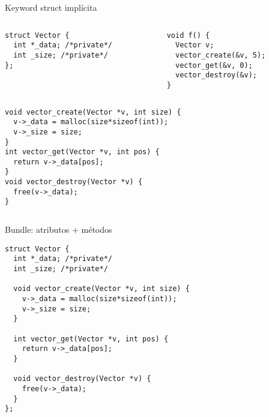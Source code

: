 \begin{frame}{Keyword struct impl\'icita}
   \begin{columns}[t]
      \begin{column}{.4\linewidth}
         \begin{lstlisting}[style=normal,firstnumber=1]
struct Vector {
  int *_data; /*private*/
  int _size; /*private*/
};


         \end{lstlisting}
      \end{column}
      \begin{column}{.4\linewidth}
         \begin{lstlisting}[style=normal,firstnumber=15,linebackgroundcolor={%
                 \btLstHLB<1>{16}%
         }]
void f() {
  Vector v;
  vector_create(&v, 5);
  vector_get(&v, 0);
  vector_destroy(&v);
}
         \end{lstlisting}
      \end{column}
   \end{columns}

   \begin{columns}[t]
      \begin{column}{.4\linewidth}
        \begin{lstlisting}[style=normal,firstnumber=5]
void vector_create(Vector *v, int size) {
  v->_data = malloc(size*sizeof(int));
  v->_size = size;
}
int vector_get(Vector *v, int pos) {
  return v->_data[pos];
}
void vector_destroy(Vector *v) {
  free(v->_data);
}

        \end{lstlisting}
      \end{column}
      \begin{column}{.4\linewidth}
      \end{column}
   \end{columns}
\end{frame}

\begin{frame}[fragile]{Bundle: atributos + m\'etodos}
        \begin{lstlisting}[style=normal,firstnumber=1]
struct Vector {
  int *_data; /*private*/
  int _size; /*private*/

  void vector_create(Vector *v, int size) {
    v->_data = malloc(size*sizeof(int));
    v->_size = size;
  }

  int vector_get(Vector *v, int pos) {
    return v->_data[pos];
  }

  void vector_destroy(Vector *v) {
    free(v->_data);
  }
};
        \end{lstlisting}
\end{frame}

